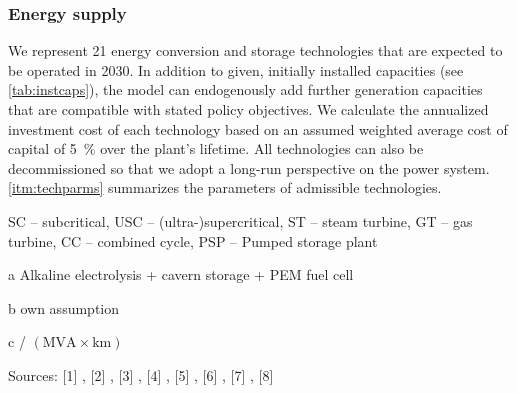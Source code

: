 \documentclass[review, 3p, times, 12pt, authoryear]{elsarticle}
\begin{document}
    \subsubsection{Energy supply}
    We represent 21 energy conversion and storage technologies that are expected to be operated in 2030.
    In addition to given, initially installed capacities (see \autoref{tab:instcaps}), the model can endogenously add further generation capacities that are compatible with stated policy objectives.
    We calculate the annualized investment cost of each technology based on an assumed weighted average cost of capital of \SI{5}{\percent} over the plant's lifetime.
    All technologies can also be decommissioned so that we adopt a long-run perspective on the power system.
    \autoref{itm:techparms} summarizes the parameters of admissible technologies.
    \begin{ThreePartTable}
        \renewcommand\TPTminimum{\textwidth}
        \begin{TableNotes}
            \footnotesize
            \item SC -- subcritical, USC -- (ultra-)supercritical, ST -- steam turbine, GT -- gas turbine, CC -- combined cycle, PSP -- Pumped storage plant
            \item[a] Alkaline electrolysis + cavern storage + PEM fuel cell
            \item[b] own assumption
            \item[c] \EUR / $(\text{MVA} \times \text{km})$
            \item Sources:
            [1] \cite{DEA2019},
            [2] \cite{Schroeder2013},
            [3] \cite{LacalArantegui2014},
            [4] \cite{OekoInstitut2017},
            [5] \cite{DEA2019},
            [6] \cite{DEA2020a},
            [7] \cite{Brown2018},
            [8] \cite{Hagspiel2014}
        \end{TableNotes}


\end{ThreePartTable}
\end{document}
